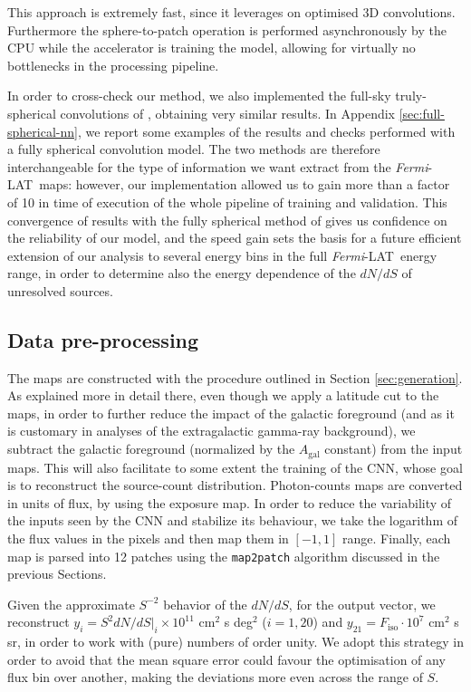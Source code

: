 \documentclass[a4paper,11pt]{article}
\newcommand{\fermi}{\textsl{Fermi}-LAT\ }
\newcommand{\fiso}{{F_\textrm{iso}}}
\newcommand{\dnds}{dN/dS }
\begin{document}
This approach is extremely fast, since it leverages on optimised 3D convolutions. Furthermore the sphere-to-patch operation is performed asynchronously by the CPU while the accelerator is training the model, allowing for virtually no bottlenecks in the processing pipeline.

In order to cross-check our method, we also implemented the full-sky truly-spherical convolutions of \cite{Krachmalnicoff:2019}, obtaining very similar results. {  In  Appendix \ref{sec:full-spherical-nn}, we report some examples of the results and checks performed with a fully spherical convolution model.} The two methods are therefore interchangeable for the type of information we want extract from the \fermi maps: however, our implementation allowed us to gain more than a factor of 10 in time of execution of the whole pipeline of training and validation. This convergence of results with the fully spherical method of \cite{Krachmalnicoff:2019} gives us confidence on the reliability of our model, and the speed gain sets the basis for a future efficient extension of our analysis to several energy bins in the full \fermi energy range, in order to determine also the energy dependence of the $\dnds$  of unresolved sources.


\subsection{Data pre-processing}
\label{sec:preprocessing}

The maps are constructed with the procedure outlined in Section \ref{sec:generation}. As explained more in detail there, even though we apply a latitude cut to the maps, in order to further reduce the impact of the galactic foreground (and as it is customary in analyses of the extragalactic gamma-ray background), we subtract the galactic foreground (normalized by the $A_\textrm{gal}$ constant) from the input maps. This will also facilitate to some extent the training of the CNN, whose goal is to reconstruct the source-count distribution. Photon-counts maps are converted in units of flux, by using the exposure map. In order to reduce the variability of the inputs seen by the CNN and stabilize its behaviour, we take the logarithm of the flux values in the pixels and then map them in $[-1,1]$ range. 
Finally, each map is parsed into 12 patches using the \verb|map2patch| algorithm discussed in the previous Sections.

Given the approximate $S^{-2}$ behavior of the $\dnds$, for the output vector, we reconstruct $y_i = S^2 \dnds|_i \times 10^{11}$ cm$^{2}$ s deg$^{2}$ ($i=1,20$) and $y_{21}=\fiso \cdot  10^{7}$ cm$^{2}$ s sr, in order to work with (pure) numbers of order unity. We adopt this strategy in order to avoid that the mean square error could favour the optimisation of any flux bin over another, making the deviations more even across the range of $S$.
\end{document}

